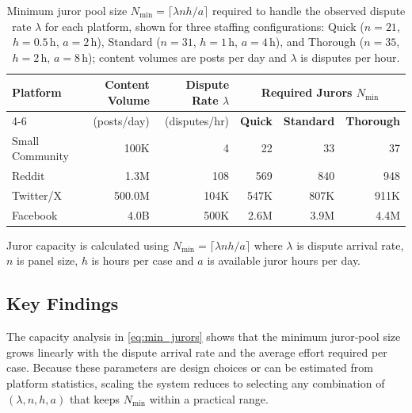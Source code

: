 \documentclass{article}
\begin{document}
\begin{table}[h]
\centering
\begin{threeparttable}
    \caption{Minimum juror pool size $N_{\min}=\lceil\lambda n h / a\rceil$ required to handle the observed dispute rate $\lambda$ for each platform, shown for three staffing configurations: Quick ($n=21$, $h=0.5\,\text{h}$, $a=2\,\text{h}$), Standard ($n=31$, $h=1\,\text{h}$, $a=4\,\text{h}$), and Thorough ($n=35$, $h=2\,\text{h}$, $a=8\,\text{h}$); content volumes are posts per day and $\lambda$ is disputes per hour.}
    \label{tab:juror-capacity}
    \begin{tabular}{@{}l r r r r r@{}}
    \toprule
    \textbf{Platform} 
      & \textbf{Content Volume} 
      & \textbf{Dispute Rate $\lambda$} 
      & \multicolumn{3}{c}{\textbf{Required Jurors} $N_{\text{min}}$} \\
    \cmidrule(lr){4-6}
    & (posts/day) & (disputes/hr) 
      & \textbf{Quick} 
      & \textbf{Standard} 
      & \textbf{Thorough} \\
    \midrule
    Small Community    & 100K   & 4     & 22  & 33   & 37   \\
    Reddit             & 1.3M   & 108   & 569 & 840  & 948  \\
    Twitter/X          & 500.0M & 104K  & 547K& 807K & 911K \\
    Facebook           & 4.0B   & 500K  & 2.6M& 3.9M & 4.4M \\
    \bottomrule
    \end{tabular}
    \begin{tablenotes}
    \footnotesize
    \item Juror capacity is calculated using \(N_{\min}= \lceil \lambda n h/a\rceil\) where \(\lambda\) is dispute arrival rate, \(n\) is panel size, \(h\) is hours per case and \(a\) is available juror hours per day. 
    \end{tablenotes}
\end{threeparttable}
\end{table}

\subsection{Key Findings}

The capacity analysis in \cref{eq:min_jurors} shows that the minimum juror‑pool size grows linearly with the dispute arrival rate and the average effort required per case. Because these parameters are design choices or can be estimated from platform statistics, scaling the system reduces to selecting any combination of $(\lambda,n,h,a)$ that keeps $N_{\min}$ within a practical range.
\end{document}

